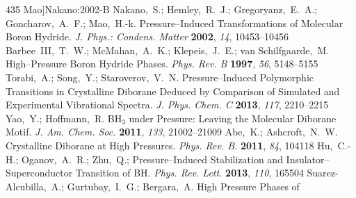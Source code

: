 \documentclass[12pt,letterpaper,oneside]{article}
\begin{document}
\begin{mcitethebibliography}{435}
  Mao]{Nakano:2002-B}
Nakano,~S.; Hemley,~R.~J.; Gregoryanz,~E.~A.; Goncharov,~A.~F.; Mao,~H.-k.
  Pressure--Induced Transformations of Molecular Boron Hydride. \emph{J. Phys.:
  Condens. Matter} \textbf{2002}, \emph{14}, 10453--10456\relax
\mciteBstWouldAddEndPuncttrue
\mciteSetBstMidEndSepPunct{\mcitedefaultmidpunct}
{\mcitedefaultendpunct}{\mcitedefaultseppunct}\relax
\EndOfBibitem
{}
Barbee~III,~T.~W.; McMahan,~A.~K.; Klepeis,~J.~E.; van Schilfgaarde,~M.
  High--Pressure Boron Hydride Phases. \emph{Phys. Rev. B} \textbf{1997},
  \emph{56}, 5148--5155\relax
\mciteBstWouldAddEndPuncttrue
\mciteSetBstMidEndSepPunct{\mcitedefaultmidpunct}
{\mcitedefaultendpunct}{\mcitedefaultseppunct}\relax
\EndOfBibitem
{}
Torabi,~A.; Song,~Y.; Staroverov,~V.~N. Pressure--Induced Polymorphic
  Transitions in Crystalline Diborane Deduced by Comparison of Simulated and
  Experimental Vibrational Spectra. \emph{J. Phys. Chem. C} \textbf{2013},
  \emph{117}, 2210--2215\relax
\mciteBstWouldAddEndPuncttrue
\mciteSetBstMidEndSepPunct{\mcitedefaultmidpunct}
{\mcitedefaultendpunct}{\mcitedefaultseppunct}\relax
\EndOfBibitem
{}
Yao,~Y.; Hoffmann,~R. BH$_3$ under Pressure: Leaving the Molecular Diborane
  Motif. \emph{J. Am. Chem. Soc.} \textbf{2011}, \emph{133}, 21002--21009\relax
\mciteBstWouldAddEndPuncttrue
\mciteSetBstMidEndSepPunct{\mcitedefaultmidpunct}
{\mcitedefaultendpunct}{\mcitedefaultseppunct}\relax
\EndOfBibitem
{}
Abe,~K.; Ashcroft,~N.~W. Crystalline Diborane at High Pressures. \emph{Phys.
  Rev. B.} \textbf{2011}, \emph{84}, 104118\relax
\mciteBstWouldAddEndPuncttrue
\mciteSetBstMidEndSepPunct{\mcitedefaultmidpunct}
{\mcitedefaultendpunct}{\mcitedefaultseppunct}\relax
\EndOfBibitem
{}
Hu,~C.-H.; Oganov,~A.~R.; Zhu,~Q.; 
  Pressure--Induced Stabilization and Insulator--Superconductor Transition of
  BH. \emph{Phys. Rev. Lett.} \textbf{2013}, \emph{110}, 165504\relax
\mciteBstWouldAddEndPuncttrue
\mciteSetBstMidEndSepPunct{\mcitedefaultmidpunct}
{\mcitedefaultendpunct}{\mcitedefaultseppunct}\relax
\EndOfBibitem
{}
Suarez-Alcubilla,~A.; Gurtubay,~I.~G.; Bergara,~A. High Pressure Phases of

\end{mcitethebibliography}
\end{document}
